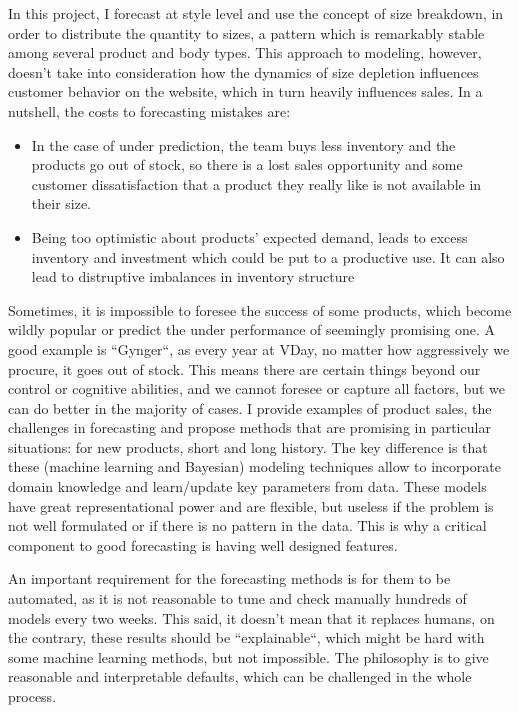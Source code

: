 \documentclass[12pt]{article}
\begin{document}
In this project, I forecast at style level and use the concept of size breakdown, in order to distribute the quantity to sizes, a pattern which is remarkably stable among several product and body types. This approach to modeling, however, doesn't take into consideration how the dynamics of size depletion influences customer behavior on the website, which in turn heavily influences sales. In a nutshell, the costs to forecasting mistakes are: 

\begin{itemize}
	\item In the case of under prediction, the team buys less inventory and the products go out of stock, so there is a lost sales opportunity and some customer dissatisfaction that a product they really like is not available in their size.
	\item Being too optimistic about products' expected demand, leads to excess inventory and investment which could be put to a productive use. It can also lead to distruptive imbalances in inventory structure
\end{itemize}

Sometimes, it is impossible to foresee the success of some products, which become wildly popular or predict the under performance of seemingly promising one. A good example is ``Gynger``, as every year at VDay, no matter how aggressively we procure, it goes out of stock. This means there are certain things beyond our control or cognitive abilities, and we cannot foresee or capture all factors, but we can do better in the majority of cases. I provide examples of product sales, the challenges in forecasting and propose methods that are promising in particular situations: for new products, short and long history. The key difference is that these (machine learning and Bayesian) modeling techniques allow to incorporate domain knowledge and learn/update key parameters from data. These models have great representational power and are flexible, but useless if the problem is not well formulated or if there is no pattern in the data. This is why a critical component to good forecasting is having well designed features.

An important requirement for the forecasting methods is for them to be automated, as it is not reasonable to tune and check manually hundreds of models every two weeks. This said, it doesn't mean that it replaces humans, on the contrary, these results should be ``explainable``, which might be hard with some machine learning methods, but not impossible. The philosophy is to give reasonable and interpretable defaults, which can be challenged in the whole process.
\end{document}
